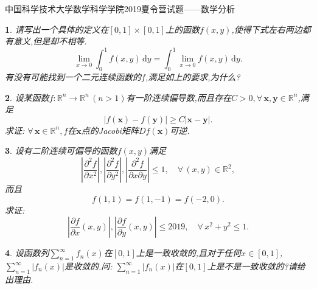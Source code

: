 \documentclass[UTF8,no-math,12pt,openany,table,dvipsnames,svgnames]{book}
\newtheorem{example}{}
\renewcommand{\le}{\leqslant}
\renewcommand{\ge}{\geqslant}
\newcommand{\bd}{\boldsymbol}
\begin{document}
\begin{MYBOX}[colbacktitle=blue]{中国科学技术大学数学科学学院2019夏令营试题——数学分析}
\begin{example}
请写出一个具体的定义在$[0,1]\times[0,1]$上的函数$f(x,y)$,使得下式左右两边都有意义,但是却不相等.
\[\lim_{x\to0}\int_0^1f(x,y)\,\mathrm dy=\int_0^1\lim_{x\to0}f(x,y)\,\mathrm dy.\]
有没有可能找到一个二元连续函数的$f$,满足如上的要求,为什么\emph{?}
\end{example}
\begin{example}
设某函数$f:\mathbb R^n\to\mathbb R^n\,(n>1)$有一阶连续偏导数,而且存在$C>0,\forall\,\bd x,\bd y\in\mathbb R^n$,满足
\[|f(\bd x)-f(\bd y)|\ge C|\bd x-\bd y|.\]
求证: $\forall\,\bd x\in\mathbb R^n,f$在$\bd x$点的\emph{Jacobi}矩阵$Df(\bd x)$可逆.
\end{example}
\begin{example}
设有二阶连续可偏导的函数$f(x,y)$满足
\[\left|\frac{\partial^2f}{\partial x^2}\right|,\left|\frac{\partial^2f}{\partial y^2}\right|,\left|\frac{\partial^2f}{\partial x\partial y}\right|\le1,\quad\forall\,(x,y)\in\mathbb R^2,\]
而且
\[f(1,1)=f(1,-1)=f(-2,0).\]
求证:
\[\left|\frac{\partial f}{\partial x}(x,y)\right|,\left|\frac{\partial f}{\partial y}(x,y)\right|\le2019,\quad\forall \,x^2+y^2\le1.\]
\end{example}
\begin{example}
设函数列$\sum_{n=1}^\infty f_n(x)$在$[0,1]$上是一致收敛的,且对于任何$x\in[0,1]$, $\sum_{n=1}^\infty|f_n(x)|$是收敛的.问: $\sum_{n=1}^\infty|f_n(x)|$在$[0,1]$上是不是一致收敛的\emph{?}请给出理由.
\end{example}
\end{MYBOX}
\end{document}

